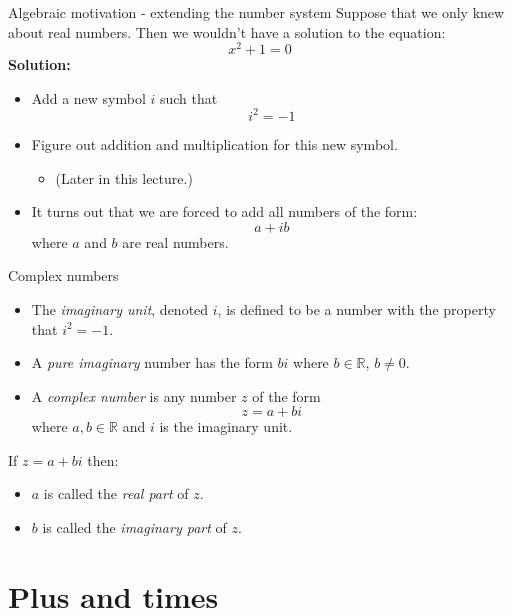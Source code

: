 \documentclass{beamer}
\begin{document}
\begin{frame}{Algebraic motivation - extending the number system}
Suppose that we only knew about real numbers.\vfill
Then we wouldn't have a solution to the equation:
\begin{equation*}
 x^2 + 1 = 0
\end{equation*}
{\bf Solution:}
\begin{itemize}
	\item Add a new symbol $i$ such that
	\begin{equation*}
	i^2 = -1
	\end{equation*}
	\item Figure out addition and multiplication for this new symbol.
	\begin{itemize}
		\item (Later in this lecture.)
	\end{itemize}
	\item It turns out that we are forced to add all numbers of the form:
	\begin{equation*}
	a+ib
	\end{equation*}
	where $a$ and $b$ are real numbers.
\end{itemize}
\end{frame}

\begin{frame}{Complex numbers}
\begin{definition}
\begin{itemize}
\item
The \emph{imaginary unit}, denoted $i$, is defined to be
a number with the property that $i^2=-1$.
\item
A \emph{pure imaginary} number has the form $bi$ where 
$b\in \mathbb{R}$, $b\neq 0$.
\item
A \emph{complex number} is any number $z$ of the form
\[ z = a + bi\]
where $a,b\in \mathbb{R}$ and $i$ is the imaginary unit.
\end{itemize}
\end{definition}
\begin{definition}
If $z = a + bi$ then:
\begin{itemize}
\item
$a$ is called the \emph{real part} of $z$.
\item
$b$ is called the \emph{imaginary part} of $z$.
\end{itemize}
\end{definition}
\end{frame}

\section{Plus and times}
\end{document}
